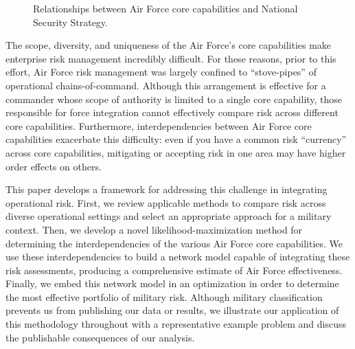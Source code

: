 \documentclass{article}
\begin{document}
\begin{figure}[!htb]
\caption{Relationships between Air Force core capabilities and National Security Strategy.}
\label{fig:nss-network}
\end{figure}

The scope, diversity, and uniqueness of the Air Force's core capabilities make enterprise risk management incredibly difficult. For these reasons, prior to this effort, Air Force risk management was largely confined to ``stove-pipes'' of operational chains-of-command. Although this arrangement is effective for a commander whose scope of authority is limited to a single core capability, those responsible for force integration cannot effectively compare risk across different core capabilities. Furthermore, interdependencies between Air Force core capabilities exacerbate this difficulty: even if you have a common risk ``currency'' across core capabilities, mitigating or accepting risk in one area may have higher order effects on others.

This paper develops a framework for addressing this challenge in integrating operational risk. First, we review applicable methods to compare risk across diverse operational settings and select an appropriate approach for a military context. Then, we develop a novel likelihood-maximization method for determining the interdependencies of the various Air Force core capabilities. We use these interdependencies to build a network model capable of integrating these risk assessments, producing a comprehensive estimate of Air Force effectiveness. Finally, we embed this network model in an optimization in order to determine the most effective portfolio of military risk. Although military classification prevents us from publishing our data or results, we illustrate our application of this methodology throughout with a representative example problem and discuss the publishable consequences of our analysis.
\end{document}
